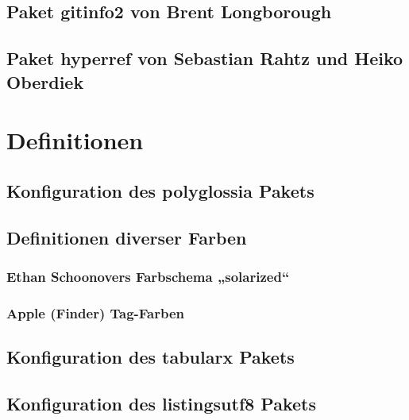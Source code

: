 \documentclass[a4paper,12pt]{article}
\begin{document}
			\section{Paket gitinfo2 von Brent Longborough}
				
			\section{Paket hyperref von Sebastian Rahtz und Heiko Oberdiek}
				
		\chapter{Definitionen}
			\section{Konfiguration des polyglossia Pakets}
				
			\section{Definitionen diverser Farben}
				\subsection{Ethan Schoonovers Farbschema „solarized“}
					
				\subsection{Apple (Finder) Tag-Farben}
					
			\section{Konfiguration des tabularx Pakets}
				
			\section{Konfiguration des listingsutf8 Pakets}
				

		
\end{document}
